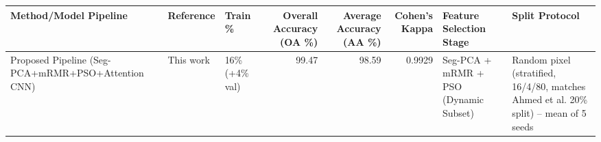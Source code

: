 \begin{tabular}{lllrrrll}
\toprule
Method/Model Pipeline & Reference & Train \% & Overall Accuracy (OA \%) & Average Accuracy (AA \%) & Cohen's Kappa & Feature Selection Stage & Split Protocol \\
\midrule
Proposed Pipeline (Seg-PCA+mRMR+PSO+Attention CNN) & This work & 16\% (+4\% val) & 99.47 & 98.59 & 0.9929 & Seg-PCA + mRMR + PSO (Dynamic Subset) & Random pixel (stratified, 16/4/80, matches Ahmed et al. 20\% split) -- mean of 5 seeds \\
\bottomrule
\end{tabular}

